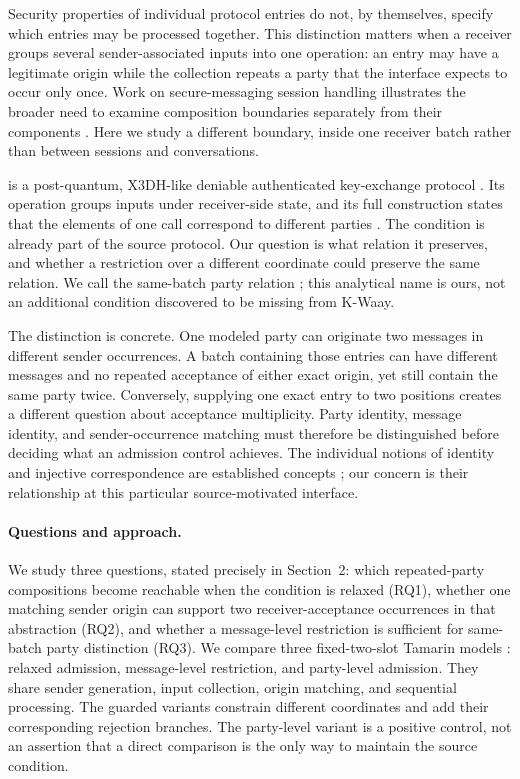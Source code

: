 Security properties of individual protocol entries do not, by themselves,
specify which entries may be processed together. This distinction matters
when a receiver groups several sender-associated inputs into one operation:
an entry may have a legitimate origin while the collection repeats a party
that the interface expects to occur only once. Work on secure-messaging
session handling illustrates the broader need to examine composition
boundaries separately from their components
\cite{cremers2023session}. Here we study a different boundary, inside one
receiver batch rather than between sessions and conversations.

\kwaay is a post-quantum, X3DH-like deniable authenticated key-exchange
protocol \cite{collins2024kwaay}. Its \batchreceive operation groups inputs
under receiver-side state, and its full construction states that the elements
of one call correspond to different parties
\cite[Sec.~5.1, p.~21]{collins2024kwaayfull}. The condition is already part of
the source protocol. Our question is what relation it preserves, and whether
a restriction over a different coordinate could preserve the same relation.
We call the same-batch party relation \distinctparty; this analytical name is
ours, not an additional condition discovered to be missing from K-Waay.

The distinction is concrete. One modeled party can originate two messages in
different sender occurrences. A batch containing those entries can have
different messages and no repeated acceptance of either exact origin, yet
still contain the same party twice. Conversely, supplying one exact entry to
two positions creates a different question about acceptance multiplicity.
Party identity, message identity, and sender-occurrence matching must
therefore be distinguished before deciding what an admission control achieves.
The individual notions of identity and injective correspondence are
established concepts \cite{lupetti2006names,lowe1997hierarchy}; our concern is
their relationship at this particular source-motivated interface.

\paragraph{Questions and approach.}
We study three questions, stated precisely in Section~2: which repeated-party
compositions become reachable when the condition is relaxed (RQ1), whether
one matching sender origin can support two receiver-acceptance occurrences in
that abstraction (RQ2), and whether a message-level restriction is sufficient
for same-batch party distinction (RQ3). We compare three fixed-two-slot
Tamarin models \cite{meier2013tamarin}: relaxed admission, message-level
restriction, and party-level admission. They share sender generation, input
collection, origin matching, and sequential processing. The guarded variants
constrain different coordinates and add their corresponding rejection
branches. The party-level variant is a positive control, not an assertion
that a direct comparison is the only way to maintain the source condition.


